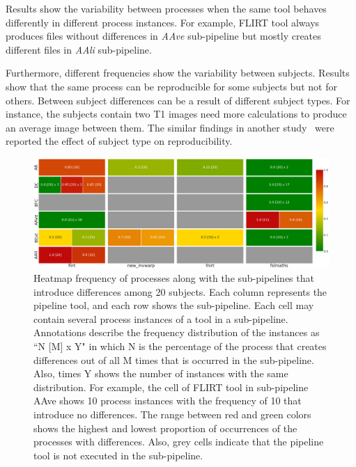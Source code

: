 \documentclass[a4paper,num-refs]{oup-contemporary}
\begin{document}
Results show the variability between processes when 
the same tool behaves differently in different process instances. For example, 
FLIRT tool always produces files without differences in \emph{AAve} sub-pipeline but 
mostly creates different files in \emph{AAli} sub-pipeline.

Furthermore, different frequencies show the variability between subjects.
Results show that the same process can be reproducible for some subjects but not for others. 
Between subject differences can be a result of different subject types. 
For instance, the subjects contain two T1 images need more calculations 
to produce an average image between them.
The similar findings in another study~\cite{bowring2019exploring} were reported 
the effect of subject type on reproducibility.

\begin{figure}
\centering
  \includegraphics[width=\textwidth]{images/pfs_heatmap.png}
  \caption{Heatmap frequency of processes along with the sub-pipelines that introduce 
           differences among 20 subjects. 
           Each column represents the pipeline tool, and each row shows the sub-pipeline.
           Each cell may contain several process instances of a tool in a sub-pipeline.
           Annotations describe the frequency distribution of the instances as ``N [M] x Y" 
           in which N is the percentage of the process 
           that creates differences out of all M times that is occurred in the sub-pipeline. 
           Also, times Y shows the number of instances with the same distribution.
           For example, the cell of FLIRT tool in sub-pipeline AAve shows 10 process instances  
           with the frequency of 10 that introduce no differences.
           The range between red and green colors shows the highest and lowest 
           proportion of occurrences of the processes with differences.
           Also, grey cells indicate that the pipeline tool is not executed in the sub-pipeline.}
  \label{fig:pfs_freq}
\end{figure}
\end{document}
